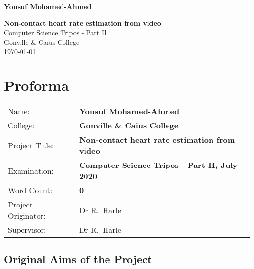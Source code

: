 \documentclass[12pt,twoside,notitlepage]{report}
\begin{document}





\pagestyle{empty}

\hfill{\LARGE \bf Yousuf Mohamed-Ahmed}

\vspace*{60mm}
\begin{center}
\Huge
{\bf Non-contact heart rate estimation from video} \\
\vspace*{5mm}
Computer Science Tripos - Part II  \\
\vspace*{5mm}
Gonville \& Caius College\\
\vspace*{5mm}
\today  %
\end{center}

\cleardoublepage


\setcounter{page}{1}
\pagestyle{plain}

\chapter*{Proforma}

{\large
\begin{tabular}{ll}
Name:               & \bf Yousuf Mohamed-Ahmed \\
College:            & \bf Gonville \& Caius College                     \\
Project Title:      & \bf Non-contact heart rate estimation from video \\
Examination:        & \bf Computer Science Tripos - Part II, July 2020    \\
Word Count:         & \bf 0\footnotemark[1] \\
Project Originator: & Dr R.~Harle                    \\
Supervisor:         & Dr R.~Harle                    \\ 
\end{tabular}
}


\section*{Original Aims of the Project}
\end{document}
